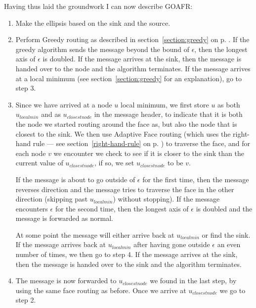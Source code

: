 Having thus laid the groundwork I can now describe GOAFR:
\begin{enumerate}
\item Make the ellipsis based on the sink and the source.
\item Perform Greedy routing as described in section~\ref{section:greedy} on p. \pageref{section:greedy}. If the greedy algorithm sends the message beyond the bound of $\epsilon$, then the longest axis of $\epsilon$ is doubled. If the message arrives at the sink, then the message is handed over to the node and the algorithm terminates. If the message arrives at a local minimum (see section~\ref{section:greedy} for an explanation), go to step 3.
\item Since we have arrived at a node $u$ local minimum, we first store $u$ as both $u_{local min}$ and as $u_{closest node}$ in the message header, to indicate that it is both the node we started routing around the face as, but also the node that is closest to the sink. We then use Adaptive Face routing (which uses the right-hand rule --- see section~\ref{right-hand-rule} on p. \pageref{right-hand-rule}) to traverse the face, and for each node $v$ we encounter we check to see if it is closer to the sink than the current value of $u_{closest node}$, if so, we set $u_{closest node}$ to be $v$. 

If the message is about to go outside of $\epsilon$ for the first time, then the message reverses direction and the message tries to traverse the face in the other direction (skipping past $u_{local min}$) without stopping). If the message encounters $\epsilon$ for the second time, then the longest axis of $\epsilon$ is doubled and the message is forwarded as normal.

At some point the message will either arrive back at $u_{local min}$ or find the sink. If the message arrives back at $u_{local min}$ after having gone outside $\epsilon$ an even number of times, we then go to step 4. If the message arrives at the sink, then the message is handed over to the sink and the algorithm terminates.
\item The message is now forwarded to $u_{closest node}$ we found in the last step, by using the same face routing as before. Once we arrive at $u_{closest node}$ we go to step 2.
\end{enumerate}

